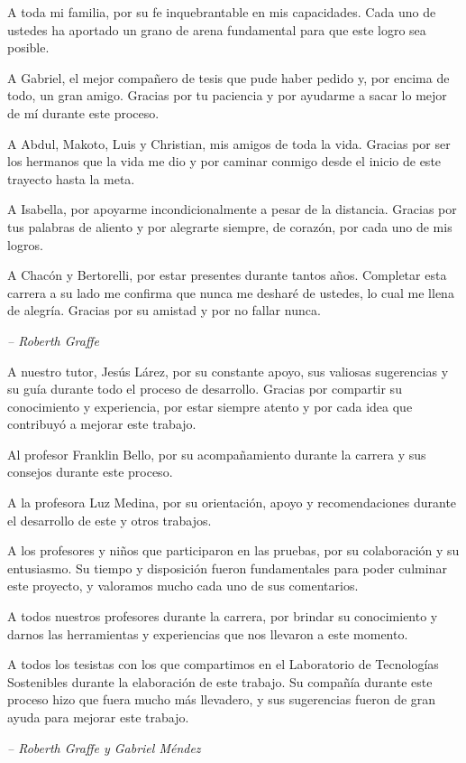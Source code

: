 A toda mi familia, por su fe inquebrantable en mis capacidades. Cada uno de ustedes ha aportado un grano de arena fundamental para que este logro sea posible.

A Gabriel, el mejor compañero de tesis que pude haber pedido y, por encima de todo, un gran amigo. Gracias por tu paciencia y por ayudarme a sacar lo mejor de mí durante este proceso.

A Abdul, Makoto, Luis y Christian, mis amigos de toda la vida. Gracias por ser los hermanos que la vida me dio y por caminar conmigo desde el inicio de este trayecto hasta la meta.

A Isabella, por apoyarme incondicionalmente a pesar de la distancia. Gracias por tus palabras de aliento y por alegrarte siempre, de corazón, por cada uno de mis logros.

A Chacón y Bertorelli, por estar presentes durante tantos años. Completar esta carrera a su lado me confirma que nunca me desharé de ustedes, lo cual me llena de alegría. Gracias por su amistad y por no fallar nunca.

\begin{flushright}
    \textit{-- Roberth Graffe}
\end{flushright}

A nuestro tutor, Jesús Lárez, por su constante apoyo, sus valiosas sugerencias y su guía durante todo el proceso de desarrollo. Gracias por compartir su conocimiento y experiencia, por estar siempre atento y por cada idea que contribuyó a mejorar este trabajo.

Al profesor Franklin Bello, por su acompañamiento durante la carrera y sus consejos durante este proceso.

A la profesora Luz Medina, por su orientación, apoyo y recomendaciones durante el desarrollo de este y otros trabajos.

A los profesores y niños que participaron en las pruebas, por su colaboración y su entusiasmo. Su tiempo y disposición fueron fundamentales para poder culminar este proyecto, y valoramos mucho cada uno de sus comentarios.

A todos nuestros profesores durante la carrera, por brindar su conocimiento y darnos las herramientas y experiencias que nos llevaron a este momento.

A todos los tesistas con los que compartimos en el Laboratorio de Tecnologías Sostenibles durante la elaboración de este trabajo. Su compañía durante este proceso hizo que fuera mucho más llevadero, y sus sugerencias fueron de gran ayuda para mejorar este trabajo.

\begin{flushright}
    \textit{-- Roberth Graffe y Gabriel Méndez}
\end{flushright}
